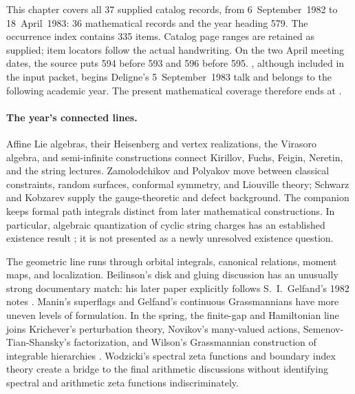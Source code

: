 \noindent This chapter covers all 37 supplied catalog records, from
6~September~1982 to 18~April~1983: 36 mathematical records and the year heading
579. The occurrence index contains 335 items. Catalog page ranges are
retained as supplied; item locators follow the actual handwriting. On the two
April meeting dates, the source puts 594 before 593 and 596 before 595.
, although included in the input packet, begins Deligne's
5~September~1983 talk and belongs to the following academic year. The present
mathematical coverage therefore ends at .

\paragraph{The year's connected lines.}
Affine Lie algebras, their Heisenberg and vertex realizations, the Virasoro
algebra, and semi-infinite constructions connect Kirillov, Fuchs, Feigin,
Neretin, and the string lectures. Zamolodchikov and Polyakov move between
classical constraints, random surfaces, conformal symmetry, and Liouville
theory; Schwarz and Kobzarev supply the gauge-theoretic and defect background.
The companion keeps formal path integrals distinct from later mathematical
constructions. In particular, algebraic quantization of cyclic string charges
has an established existence result
\citep{enriquezhalbout2010quantization,bahnsmeinecke2011string}; it is not
presented as a newly unresolved existence question.

The geometric line runs through orbital integrals, canonical relations,
moment maps, and localization. Beilinson's disk and gluing discussion has an
unusually strong documentary match: his later paper explicitly follows
S.~I.~Gelfand's 1982 notes \citep[introduction]{beilinson1987glue}.
Manin's superflags and Gelfand's continuous Grassmannians have more uneven
levels of formulation. In the spring, the finite-gap and Hamiltonian line
joins Krichever's perturbation theory, Novikov's many-valued actions,
Semenov-Tian-Shansky's factorization, and Wilson's Grassmannian construction
of integrable hierarchies \citep{krichever1983hessians,semenov1983classical,segalwilson1985loop}.
Wodzicki's spectral zeta functions and boundary index theory create a bridge
to the final arithmetic discussions without identifying spectral and
arithmetic zeta functions indiscriminately.

